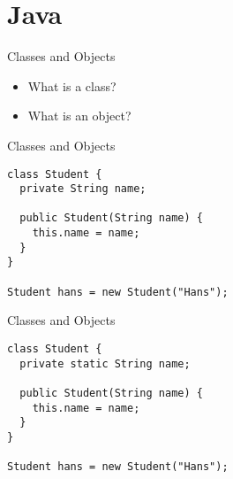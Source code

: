 \documentclass[presentation]{beamer}
\begin{document}
\section{Java}
\label{sec:orgb8fc8ca}
\begin{frame}[<+->][label={sec:org2b5b93c}]{Classes and Objects}
\begin{itemize}
\item What is a class?
\item What is an object?
\end{itemize}
\end{frame}
\begin{frame}[label={sec:org8719c36},fragile]{Classes and Objects}
 \begin{verbatim}
class Student {
  private String name;

  public Student(String name) {
    this.name = name;
  }
}

Student hans = new Student("Hans");
\end{verbatim}
\end{frame}
\begin{frame}[label={sec:orgc0a9326},fragile]{Classes and Objects}
 \begin{verbatim}
class Student {
  private static String name;

  public Student(String name) {
    this.name = name;
  }
}

Student hans = new Student("Hans");
\end{verbatim}
\end{frame}
\end{document}
